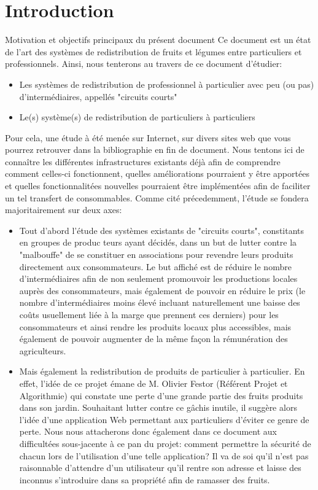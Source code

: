 \chapter*{Introduction}

Motivation et objectifs principaux du présent document
Ce document est un état de l'art des systèmes de redistribution de fruits et légumes entre particuliers et professionnels. Ainsi, nous tenterons au travers de ce document d'étudier:
\begin{itemize}
\item{Les systèmes de redistribution de professionnel à particulier avec peu (ou pas) d'intermédiaires, appellés "circuits courts"} 
\item{Le(s) système(s) de redistribution de particuliers à particuliers}
\end{itemize}
Pour cela, une étude à été menée sur Internet, sur divers sites web que vous pourrez retrouver dans la bibliographie en fin de document. Nous tentons ici de connaître les différentes infrastructures existants déjà afin de comprendre comment celles-ci fonctionnent, quelles améliorations pourraient y être apportées et quelles fonctionnalitées nouvelles pourraient être implémentées afin de faciliter un tel transfert de consommables. Comme cité précedemment, l'étude se fondera majoritairement sur deux axes:

\begin{itemize}
	\item Tout d'abord l'étude des systèmes existants de "circuits courts", constitants en groupes de produc
teurs ayant décidés, dans un but de lutter contre la "malbouffe" de se constituer en associations pour revendre leurs produits directement aux consommateurs. Le but affiché est de réduire le nombre d'intermédiaires afin de non seulement promouvoir les productions locales auprès des consommateurs, mais également de pouvoir en réduire le prix (le nombre d'intermédiaires moins élevé incluant naturellement une baisse des coûts usuellement liée à la marge que prennent ces derniers) pour les consommateurs et ainsi rendre les produits locaux plus accessibles, mais également de pouvoir augmenter de la même façon la rémunération des agriculteurs. 
	\item Mais également la redistribution de produits de particulier à particulier. En effet, l'idée de ce projet émane de M. Olivier Festor (Référent Projet et Algorithmie) qui constate une perte d'une grande partie des fruits produits dans son jardin. Souhaitant lutter contre ce gâchis inutile, il suggère alors l'idée d'une application Web permettant aux particuliers d'éviter ce genre de perte. Nous nous attacherons donc également dans ce document aux difficultées sous-jacente à ce pan du projet: comment permettre la sécurité de chacun lors de l'utilisation d'une telle application? Il va de soi qu'il n'est pas raisonnable d'attendre d'un utilisateur qu'il rentre son adresse et laisse des inconnus s'introduire dans sa propriété afin de ramasser des fruits.
\end{itemize}
